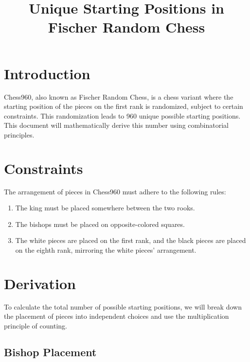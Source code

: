 \documentclass{article}
\begin{document}
\pagestyle{fancy}
\fancyhead{} %
\fancyfoot{} %
\fancyhead[R]{\thepage}

\title{Unique Starting Positions in Fischer Random Chess}
\author{}
\date{}
\maketitle

\section{Introduction}

Chess960, also known as Fischer Random Chess, is a chess variant where the starting position of the pieces on the first rank is randomized, subject to certain constraints. This randomization leads to 960 unique possible starting positions. This document will mathematically derive this number using combinatorial principles.

\section{Constraints}

The arrangement of pieces in Chess960 must adhere to the following rules:

\begin{enumerate}
    \item The king must be placed somewhere between the two rooks.
    \item The bishops must be placed on opposite-colored squares.
    \item The white pieces are placed on the first rank, and the black pieces are placed on the eighth rank, mirroring the white pieces' arrangement.
\end{enumerate}

\section{Derivation}

To calculate the total number of possible starting positions, we will break down the placement of pieces into independent choices and use the multiplication principle of counting.

\subsection{Bishop Placement}
\end{document}
